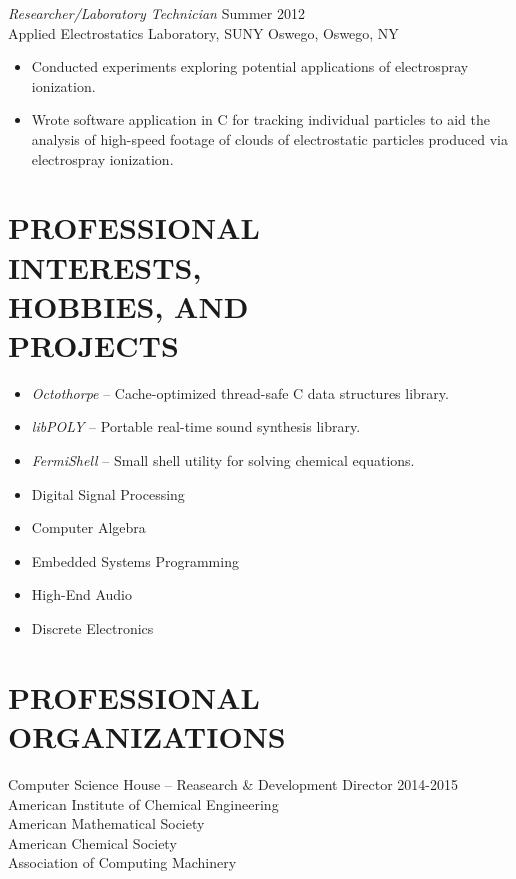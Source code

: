 \documentclass[line,margin]{res}
\begin{document}
\begin{resume}
                {\sl Researcher/Laboratory Technician} \hfill Summer 2012 \\
                Applied Electrostatics Laboratory, 
                SUNY Oswego, Oswego, NY
                 \begin{itemize}  \itemsep -2pt %
                \item   Conducted experiments exploring potential applications of electrospray ionization.
		\item   Wrote software application in C
			for tracking individual particles
			to aid the analysis of high-speed footage
			of clouds of electrostatic particles
			produced via electrospray ionization.
                \end{itemize}

\section{PROFESSIONAL \\ INTERESTS, \\ HOBBIES, AND \\ PROJECTS}
				\begin{itemize} \itemsep -2pt
				\item	\emph{Octothorpe} -- Cache-optimized thread-safe C data structures library.
				\item	\emph{libPOLY} -- Portable real-time sound synthesis library.
				\item	\emph{FermiShell} -- Small shell utility for solving chemical equations.
				\item	Digital Signal Processing
				\item	Computer Algebra
				\item	Embedded Systems Programming
				\item	High-End Audio
				\item	Discrete Electronics
				\end{itemize}

\section{PROFESSIONAL ORGANIZATIONS}
Computer Science House -- Reasearch \& Development Director 2014-2015\\
American Institute of Chemical Engineering\\
American Mathematical Society\\
American Chemical Society\\
Association of Computing Machinery\\

\end{resume}
\end{document}
